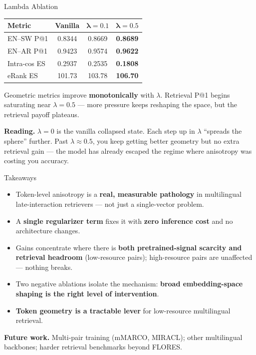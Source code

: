 \documentclass[20pt]{extarticle}
\newcommand{\bodysize}{\fontsize{19}{24}\selectfont}
\newcommand{\callout}{\fontsize{18}{23}\selectfont}
\begin{document}
\begin{minipage}[t]{0.315\linewidth}
\vspace{10pt}

\begin{sectionbox}{Lambda Ablation}
\centering
\renewcommand{\arraystretch}{1.25}
\begin{tabular}{lccc}
\toprule
\textbf{Metric} & \textbf{Vanilla} & $\boldsymbol{\lambda{=}0.1}$ & $\boldsymbol{\lambda{=}0.5}$ \\
\midrule
EN--SW P@1   & 0.8344 & 0.8669 & \textbf{0.8689} \\
EN--AR P@1   & 0.9423 & 0.9574 & \textbf{0.9622} \\
Intra-cos ES & 0.2937 & 0.2535 & \textbf{0.1808} \\
eRank ES     & 101.73 & 103.78 & \textbf{106.70} \\
\bottomrule
\end{tabular}

\vspace{6pt}
\raggedright\bodysize
Geometric metrics improve \textbf{monotonically} with $\lambda$. Retrieval P@1 begins saturating near $\lambda=0.5$ --- more pressure keeps reshaping the space, but the retrieval payoff plateaus.

\begin{intuitionbox}
\callout
\textbf{Reading.} $\lambda=0$ is the vanilla collapsed state. Each step up in $\lambda$ ``spreads the sphere'' further. Past $\lambda \approx 0.5$, you keep getting better geometry but no extra retrieval gain --- the model has already escaped the regime where anisotropy was costing you accuracy.
\end{intuitionbox}
\end{sectionbox}

\vspace{10pt}

\begin{sectionbox}{Takeaways}
\begin{itemize}[leftmargin=24pt, itemsep=6pt, topsep=4pt]
\item Token-level anisotropy is a \textbf{real, measurable pathology} in multilingual late-interaction retrievers --- not just a single-vector problem.
\item A \textbf{single regularizer term} fixes it with \textbf{zero inference cost} and no architecture changes.
\item Gains concentrate where there is \textbf{both pretrained-signal scarcity and retrieval headroom} (low-resource pairs); high-resource pairs are unaffected --- nothing breaks.
\item Two negative ablations isolate the mechanism: \textbf{broad embedding-space shaping is the right level of intervention}.
\item \textbf{Token geometry is a tractable lever} for low-resource multilingual retrieval.
\end{itemize}

\vspace{4pt}
\textbf{Future work.} Multi-pair training (mMARCO, MIRACL); other multilingual backbones; harder retrieval benchmarks beyond FLORES.
\end{sectionbox}

\end{minipage}
\end{document}
